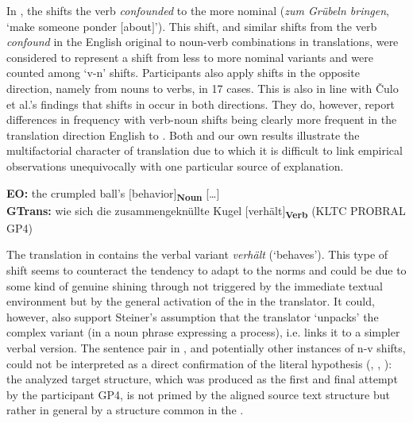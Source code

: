 \documentclass[output=paper]{LSP/langsci}
\begin{document}
In , the  shifts the verb \textit{confounded} to the more nominal (\textit{zum Grübeln bringen}, `make someone ponder $[$about$]$'). This shift, and similar shifts from the verb \textit{confound} in the English original to noun-verb combinations in  translations, were considered to represent a shift from less to more nominal variants and were counted among `v-n' shifts.  
Participants also apply shifts in the opposite direction, namely from nouns to verbs, in 17 cases. This is also in line with Čulo et al.'s \citeyearpar{Culo2008} findings that shifts in  occur in both directions. They do, however, report differences in frequency with verb-noun shifts being clearly more frequent in the translation direction English to . Both \cite{Culo2008} and our own results illustrate the multifactorial character of translation due to which it is difficult to link empirical observations unequivocally with one particular source of explanation. 

\ea \label{serbinaetal:ex:6}
\textbf{EO:} the crumpled ball's $[$behavior$]$\textsubscript{\textbf{Noun}} [\ldots] \\
\textbf{GTrans:} wie sich die zusammengeknüllte Kugel $[$verhält$]$\textsubscript{\textbf{Verb}} (KLTC PROBRAL GP4)
\z

The translation in  contains the verbal variant \textit{verhält} (`behaves'). This type of shift seems to counteract the tendency to adapt to the  norms and could be due to some kind of genuine  shining through \citep{Evert2017} not triggered by the immediate  textual environment but by the general activation of the  in the translator. It could, however, also support Steiner's \citeyearpar{Steiner2001Translations} assumption that the translator `unpacks' the complex variant (in  a noun phrase expressing a process), i.e. links it to a simpler verbal version. The sentence pair in , and potentially other instances of n-v shifts, could not be interpreted as a direct confirmation of the literal hypothesis (\citealt{TirkkonenCondit2005}, \citealt{Schaeffer2013Shared}, \citealt{Halverson2015}): the analyzed target structure, which was produced as the first and final attempt by the participant GP4, is not primed by the aligned source text structure but rather in general by a structure common in the .
\end{document}

